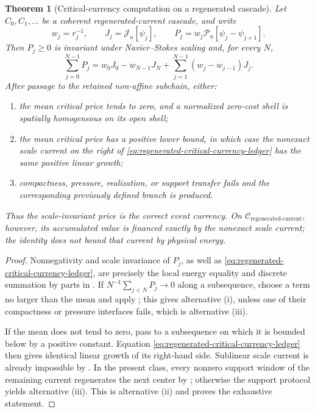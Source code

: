\documentclass[11pt]{amsart}
\numberwithin{equation}{section}
\theoremstyle{plain}
\newtheorem{theorem}{Theorem}[section]
\theoremstyle{definition}
\theoremstyle{remark}
\newcommand{\Cregen}{\mathcal C_{\mathrm{regenerated\text{-}current}}}
\begin{document}
\begin{theorem}[Critical-currency computation on a regenerated cascade]
\label{thm:critical-currency-regenerated-cascade}
Let \(C_0,C_1,\ldots\) be a coherent regenerated-current cascade, and write
\[
 w_j=r_j^{-1},\qquad
 J_j=\mathscr J_u[\psi_j],\qquad
 P_j=w_j\mathscr P_u[\psi_j-\psi_{j+1}].
\]
Then \(P_j\ge0\) is invariant under Navier--Stokes scaling and, for every
\(N\),
\begin{equation}\label{eq:regenerated-critical-currency-ledger}
 \sum_{j=0}^{N-1}P_j
 =w_0J_0-w_{N-1}J_N
  +\sum_{j=1}^{N-1}(w_j-w_{j-1})J_j.
\end{equation}
After passage to the retained non-affine subchain, either:
\begin{enumerate}[label=\textup{(\roman*)}]
 \item the mean critical price tends to zero, and a normalized zero-cost shell
 is spatially homogeneous on its open shell;
 \item the mean critical price has a positive lower bound, in which case the
 nonexact scale current on the right of
 \eqref{eq:regenerated-critical-currency-ledger} has the same positive linear
 growth;
 \item compactness, pressure, realization, or support transfer fails and the
 corresponding previously defined branch is produced.
\end{enumerate}
Thus the scale-invariant price is the correct event currency.  On
\(\Cregen\), however, its accumulated value is financed exactly by the
nonexact scale current; the identity does not bound that current by physical
energy.
\end{theorem}

\begin{proof}
Nonnegativity and scale invariance of \(P_j\), as well as
\eqref{eq:regenerated-critical-currency-ledger}, are precisely the local
energy equality and discrete summation by parts in
.  If
\(N^{-1}\sum_{j<N}P_j\to0\) along a subsequence, choose a term no larger than
the mean and apply
;
this gives alternative \textup{(i)}, unless one of their compactness or
pressure interfaces fails, which is alternative \textup{(iii)}.

If the mean does not tend to zero, pass to a subsequence on which it is bounded
below by a positive constant.  Equation
\eqref{eq:regenerated-critical-currency-ledger} then gives identical linear
growth of its right-hand side.  Sublinear scale current is already impossible
by .  In the present
class, every nonzero support window of the remaining current regenerates the
next center by ; otherwise the support
protocol yields alternative \textup{(iii)}.  This is alternative
\textup{(ii)} and proves the exhaustive statement.
\end{proof}
\end{document}
